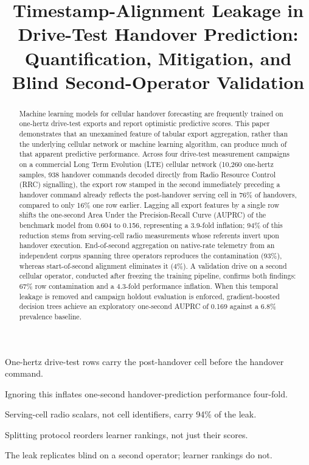 \documentclass[preprint,review,12pt]{elsarticle}\usepackage{lineno}\linenumbers
\begin{document}
\begin{frontmatter}

\title{Timestamp-Alignment Leakage in Drive-Test Handover Prediction: Quantification, Mitigation, and Blind Second-Operator Validation}

\author{}

\begin{abstract}
Machine learning models for cellular handover forecasting are frequently trained on one-hertz drive-test exports and report optimistic predictive scores. This paper demonstrates that an unexamined feature of tabular export aggregation, rather than the underlying cellular network or machine learning algorithm, can produce much of that apparent predictive performance. Across four drive-test measurement campaigns on a commercial Long Term Evolution (LTE) cellular network (10,260 one-hertz samples, 938 handover commands decoded directly from Radio Resource Control (RRC) signalling), the export row stamped in the second immediately preceding a handover command already reflects the post-handover serving cell in 76\% of handovers, compared to only 16\% one row earlier. Lagging all export features by a single row shifts the one-second Area Under the Precision-Recall Curve (AUPRC) of the benchmark model from 0.604 to 0.156, representing a 3.9-fold inflation; 94\% of this reduction stems from serving-cell radio measurements whose referents invert upon handover execution. End-of-second aggregation on native-rate telemetry from an independent corpus spanning three operators reproduces the contamination (93\%), whereas start-of-second alignment eliminates it (4\%). A validation drive on a second cellular operator, conducted after freezing the training pipeline, confirms both findings: 67\% row contamination and a 4.3-fold performance inflation. When this temporal leakage is removed and campaign holdout evaluation is enforced, gradient-boosted decision trees achieve an exploratory one-second AUPRC of 0.169 against a 6.8\% prevalence baseline.
\end{abstract}

\begin{highlights}
\item One-hertz drive-test rows carry the post-handover cell before the handover command.
\item Ignoring this inflates one-second handover-prediction performance four-fold.
\item Serving-cell radio scalars, not cell identifiers, carry 94\% of the leak.
\item Splitting protocol reorders learner rankings, not just their scores.
\item The leak replicates blind on a second operator; learner rankings do not.
\end{highlights}


\end{frontmatter}
\end{document}
